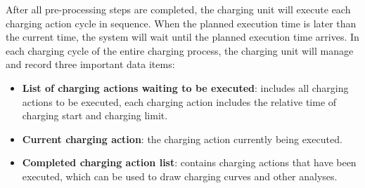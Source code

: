\documentclass[
english,
ruledheaders=section,%
class=report,%
thesis={type=Report},%
accentcolor=9c,%
custommargins=true,%
marginpar=false,%
parskip=half-,%
fontsize=11pt,%
logofile={img/tuda_logo.pdf}, %
]{tudapub}
\begin{document}
\begin{enumerate}[label=\Alph*.]

        After all pre-processing steps are completed, the charging unit will execute each charging action cycle in sequence. When the planned execution time is later than the current time, the system will wait until the planned execution time arrives.
        In each charging cycle of the entire charging process, the charging unit will manage and record three important data items:
        \begin{itemize}
            \item \textbf{List of charging actions waiting to be executed}: includes all charging actions to be executed, each charging action includes the relative time of charging start and charging limit.
            \item \textbf{Current charging action}: the charging action currently being executed.
            \item \textbf{Completed charging action list}: contains charging actions that have been executed, which can be used to draw charging curves and other analyses.
        \end{itemize}



\end{enumerate}
\end{document}
